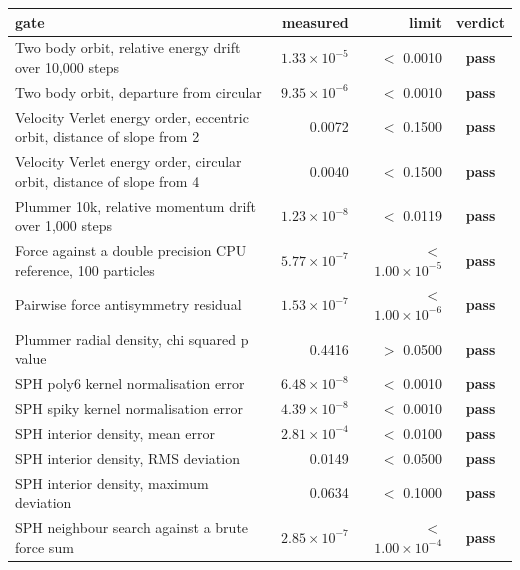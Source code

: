 \begin{tabular}{l r r c}
\toprule
gate & measured & limit & verdict \\
\midrule
Two body orbit, relative energy drift over 10,000 steps & $1.33 \times 10^{-5}$ & $<$ 0.0010 & \textbf{pass} \\
Two body orbit, departure from circular & $9.35 \times 10^{-6}$ & $<$ 0.0010 & \textbf{pass} \\
Velocity Verlet energy order, eccentric orbit, distance of slope from 2 & 0.0072 & $<$ 0.1500 & \textbf{pass} \\
Velocity Verlet energy order, circular orbit, distance of slope from 4 & 0.0040 & $<$ 0.1500 & \textbf{pass} \\
Plummer 10k, relative momentum drift over 1,000 steps & $1.23 \times 10^{-8}$ & $<$ 0.0119 & \textbf{pass} \\
Force against a double precision CPU reference, 100 particles & $5.77 \times 10^{-7}$ & $<$ $1.00 \times 10^{-5}$ & \textbf{pass} \\
Pairwise force antisymmetry residual & $1.53 \times 10^{-7}$ & $<$ $1.00 \times 10^{-6}$ & \textbf{pass} \\
Plummer radial density, chi squared p value & 0.4416 & $>$ 0.0500 & \textbf{pass} \\
SPH poly6 kernel normalisation error & $6.48 \times 10^{-8}$ & $<$ 0.0010 & \textbf{pass} \\
SPH spiky kernel normalisation error & $4.39 \times 10^{-8}$ & $<$ 0.0010 & \textbf{pass} \\
SPH interior density, mean error & $2.81 \times 10^{-4}$ & $<$ 0.0100 & \textbf{pass} \\
SPH interior density, RMS deviation & 0.0149 & $<$ 0.0500 & \textbf{pass} \\
SPH interior density, maximum deviation & 0.0634 & $<$ 0.1000 & \textbf{pass} \\
SPH neighbour search against a brute force sum & $2.85 \times 10^{-7}$ & $<$ $1.00 \times 10^{-4}$ & \textbf{pass} \\
\bottomrule
\end{tabular}

